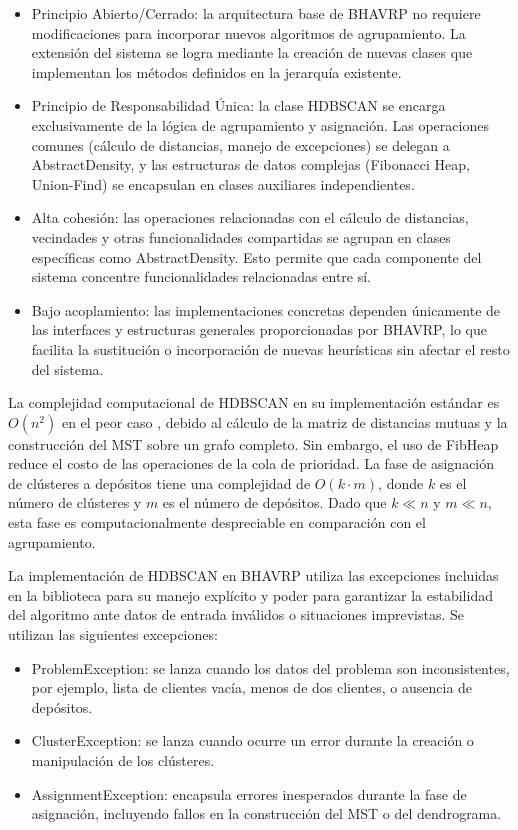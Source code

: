\begin{itemize}
  \item Principio Abierto/Cerrado: la arquitectura base de BHAVRP no requiere modificaciones para incorporar nuevos algoritmos de agrupamiento. La extensi\'on del sistema se logra mediante la creaci\'on de nuevas clases que implementan los m\'etodos definidos en la jerarqu\'ia existente.
  \item Principio de Responsabilidad Única: la clase HDBSCAN se encarga exclusivamente de la lógica de agrupamiento y asignación. Las operaciones comunes (cálculo de distancias, manejo de excepciones) se delegan a AbstractDensity, y las estructuras de datos complejas (Fibonacci Heap, Union-Find) se encapsulan en clases auxiliares independientes.
  \item Alta cohesi\'on: las operaciones relacionadas con el c\'alculo de distancias, vecindades y otras funcionalidades compartidas se agrupan en clases espec\'ificas como AbstractDensity. Esto permite que cada componente del sistema concentre funcionalidades relacionadas entre s\'i.
  \item Bajo acoplamiento: las implementaciones concretas dependen \'unicamente de las interfaces y estructuras generales proporcionadas por BHAVRP, lo que facilita la sustituci\'on o incorporaci\'on de nuevas heur\'isticas sin afectar el resto del sistema.
\end{itemize}

La complejidad computacional de HDBSCAN en su implementación estándar es \(O(n^2)\) en el peor caso \parencite{abduaziz2025minimal}, debido al cálculo de la matriz de distancias mutuas y la construcción del MST sobre un grafo completo. Sin embargo, el uso de FibHeap reduce el costo de las operaciones de la cola de prioridad. La fase de asignación de clústeres a depósitos tiene una complejidad de \(O(k \cdot m)\), donde \(k\) es el número de clústeres y \(m\) es el número de depósitos. Dado que \(k \ll n\) y \(m \ll n\), esta fase es computacionalmente despreciable en comparación con el agrupamiento.

La implementación de HDBSCAN en BHAVRP utiliza las excepciones incluidas en la biblioteca para su manejo explícito y poder para garantizar la estabilidad del algoritmo ante datos de entrada inválidos o situaciones imprevistas. Se utilizan las siguientes excepciones:

\begin{itemize}
    \item ProblemException: se lanza cuando los datos del problema son inconsistentes, por ejemplo, lista de clientes vacía, menos de dos clientes, o ausencia de depósitos.
    \item ClusterException: se lanza cuando ocurre un error durante la creación o manipulación de los clústeres.
    \item AssignmentException: encapsula errores inesperados durante la fase de asignación, incluyendo fallos en la construcción del MST o del dendrograma.
\end{itemize}

